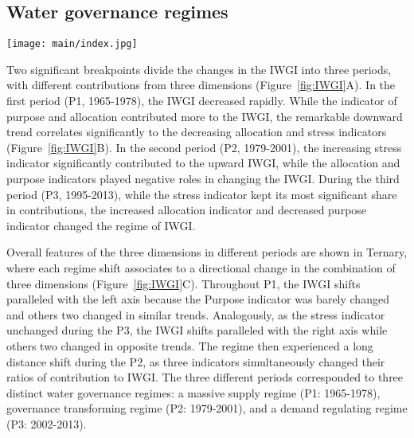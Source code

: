 \subsection{Water governance regimes}
\label{Res.1}

\begin{figure*}[ht!]
	\centering
	\texttt{[image: main/index.jpg]}
	\caption{Changes in the IWGI index.
	\textbf{A,} Change points detection. With significant change points in 1978 and 1994, the IWGI has three different periods.
	\textbf{B,} Contributions of each dimension to the changes of IWGI within each of the three periods. Supply, purpose and allocation were the main positive contributors to P1, P2 and P3.
	\textbf{C,} Combination of contributions across three dimensions in different periods (S: supply; P: purpose; A: allocation). The closer a point is to an angle of the outside triangle, the greater the proportion of the contribution of this dimension.
	The red indicator line in this plot denotes a 1:1 contributions between purpose (P) and allocation (A). When the points are below this line, the contribution ratio of allocation is lower than that of function, and \textit{vice versa}.
	}
	\label{fig:IWGI}
\end{figure*}

Two significant breakpoints divide the changes in the IWGI into three periods, with different contributions from three dimensions (Figure~\ref{fig:IWGI}A).
In the first period (P1, 1965-1978), the IWGI decreased rapidly.
While the indicator of purpose and allocation contributed more to the IWGI, the remarkable downward trend correlates significantly to the decreasing allocation and stress indicators (Figure~\ref{fig:IWGI}B).
In the second period (P2, 1979-2001), the increasing stress indicator significantly contributed to the upward IWGI, while the allocation and purpose indicators played negative roles in changing the IWGI.
During the third period (P3, 1995-2013), while the stress indicator kept its most significant share in contributions, the increased allocation indicator and decreased purpose indicator changed the regime of IWGI.

Overall features of the three dimensions in different periods are shown in Ternary, where each regime shift associates to a directional change in the combination of three dimensions (Figure~\ref{fig:IWGI}C).
Throughout P1, the IWGI shifts paralleled with the left axis because the Purpose indicator was barely changed and others two changed in similar trends.
Analogously, as the stress indicator unchanged during the P3, the IWGI shifts paralleled with the right axis while others two changed in opposite trends.
The regime then experienced a long distance shift during the P2, as three indicators simultaneously changed their ratios of contribution to IWGI.
The three different periods corresponded to three distinct water governance regimes: a massive supply regime (P1: 1965-1978), governance transforming regime (P2: 1979-2001), and a demand regulating regime (P3: 2002-2013).


